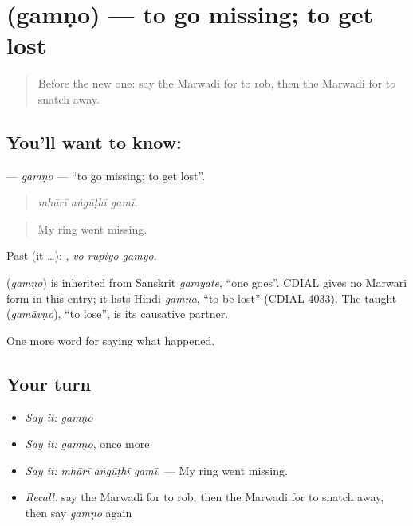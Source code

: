\section[\texorpdfstring{\mw{गमणो} (gamṇo)}{गमणो (gamṇo)}]{ (gamṇo) — to go missing; to get lost}

\label{lesson:MW-C243-gamno}



\begin{quote}
Before the new one: say the Marwadi for to rob, then the Marwadi for to snatch away.
\end{quote}

\subsection*{You'll want to know: }
\textbf{} — \emph{gamṇo} — \textquotedblleft{}to go missing; to get lost\textquotedblright{}.

\begin{quote}
  
\end{quote}

\begin{quote}
\emph{mhārī aṅgūṭhī gamī.}
\end{quote}

\begin{quote}
My ring went missing.
\end{quote}

Past (it …):   , \emph{vo rupiyo gamyo}.

\begin{cousinweb}
\textbf{} (\emph{gamṇo}) is inherited from Sanskrit \emph{gamyate}, \textquotedblleft{}one goes\textquotedblright{}. CDIAL gives no Marwari form in this entry; it lists Hindi \emph{gamnā}, \textquotedblleft{}to be lost\textquotedblright{} (CDIAL 4033). The taught \textbf{} (\emph{gamāvṇo}), \textquotedblleft{}to lose\textquotedblright{}, is its causative partner.
\end{cousinweb}

\begin{grammarlens}[title={What you've built}]
One more word for saying what happened.
\end{grammarlens}

\subsection*{Your turn}
\begin{itemize}
\raggedright
  \item \emph{Say it:} \emph{gamṇo}
  \item \emph{Say it:} \emph{gamṇo}, once more
  \item \emph{Say it:} \emph{mhārī aṅgūṭhī gamī.} — My ring went missing.
  \item \emph{Recall:} say the Marwadi for to rob, then the Marwadi for to snatch away, then say \emph{gamṇo} again
\end{itemize}

